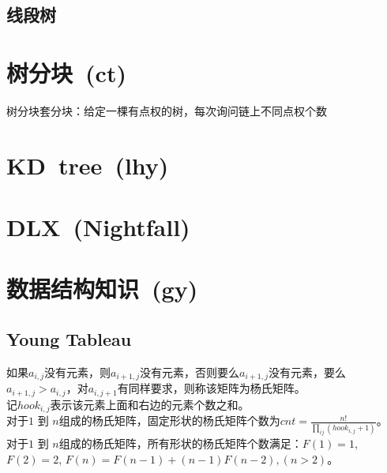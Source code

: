     \subsection*{线段树}
\section{树分块\ \small(ct)}
    树分块套分块：给定一棵有点权的树，每次询问链上不同点权个数
\section{KD\ tree\ \small(lhy)}
\section{DLX\ \small(Nightfall)}
\section{数据结构知识\ \small(gy)}
    \subsection*{Young Tableau}
        如果$ a_{i, j} $没有元素，则$ a_{i + 1, j} $没有元素，否则要么$ a_{i + 1, j} $没有元素，要么$ a_{i + 1, j} > a_{i, j} $，对$ a_{i, j + 1} $有同样要求，则称该矩阵为杨氏矩阵。\\
        记$ hook_{i, j} $表示该元素上面和右边的元素个数之和。\\
        对于$ 1 $ 到 $ n $组成的杨氏矩阵，固定形状的杨氏矩阵个数为$ cnt = \frac{n!}{\prod\limits_{ij} (hook_{i, j} + 1)} $。\\
        对于$ 1 $ 到 $ n $组成的杨氏矩阵，所有形状的杨氏矩阵个数满足：$ F(1) = 1 $, $ F(2) = 2 $, $ F(n) = F(n - 1) + (n - 1) F(n - 2), (n > 2) $。
